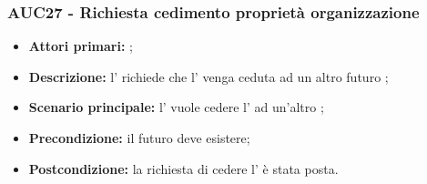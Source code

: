 \documentclass[casi-duso]{subfiles}
\begin{document}
\subsubsection{AUC27 - Richiesta cedimento proprietà organizzazione}
\label{subsub:AUC27}
\begin{itemize}
  \item \textbf{Attori primari:} ;
  \item \textbf{\textbf{Descrizione:}} l'  richiede che l' venga ceduta ad un altro futuro ;
  \item \textbf{\textbf{Scenario principale:}} l'  vuole cedere l' ad un'altro ;
  \item \textbf{Precondizione:} il futuro  deve esistere;
  \item \textbf{Postcondizione:} la richiesta di cedere l' è stata posta.
\end{itemize}

\end{document}
